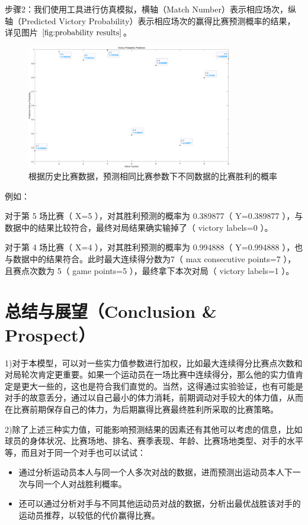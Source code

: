 \documentclass[12pt]{article}
\begin{document}
步骤2：我们使用工具进行仿真模拟，横轴（Match Number）表示相应场次，纵轴（Predicted Victory Probability）表示相应场次的赢得比赛预测概率的结果，详见图片 $\ref{fig:probability results}$。

\begin{figure}[h]
	\centering
	\includegraphics[width=0.8\textwidth]{../images/probability results}
	\caption{根据历史比赛数据，预测相同比赛参数下不同数据的比赛胜利的概率}
	\label{fig:probability results}
\end{figure}
例如：

对于第 5 场比赛（ X=5 ），对其胜利预测的概率为 0.389877（ Y=0.389877 ），与数据中的结果比较符合，最终对局结果确实输掉了（ victory labels=0 ）。

对于第 4 场比赛（ X=4 ），对其胜利预测的概率为 0.994888（ Y=0.994888 ），也与数据中的结果符合。此时最大连续得分数为7（ max consecutive points=7 ），且赛点次数为 5（ game points=5 ），最终拿下本次对局（ victory labels=1 ）。


\section{总结与展望（Conclusion \& Prospect）}
1)对于本模型，可以对一些实力值参数进行加权，比如最大连续得分比赛点次数和对局轮次肯定更重要。如果一个运动员在一场比赛中连续得分，那么他的实力值肯定是更大一些的，这也是符合我们直觉的。当然，这得通过实验验证，也有可能是对手的故意丢分，通过以自己最小的体力消耗，前期调动对手较大的体力值，从而在比赛前期保存自己的体力，为后期赢得比赛最终胜利所采取的比赛策略。

2)除了上述三种实力值，可能影响预测结果的因素还有其他可以考虑的信息，比如球员的身体状况、比赛场地、排名、赛季表现、年龄、比赛场地类型、对手的水平等，而且对于同一个对手也可以试试：
\begin{itemize}
	\item 通过分析运动员本人与同一个人多次对战的数据，进而预测出运动员本人下一次与同一个人对战胜利概率。
	\item 还可以通过分析对手与不同其他运动员对战的数据，分析出最优战胜该对手的运动员推荐，以较低的代价赢得比赛。
\end{itemize}
\end{document}
